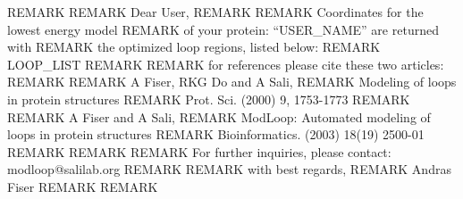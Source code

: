 REMARK 
REMARK     Dear User,
REMARK    
REMARK     Coordinates for the lowest energy model 
REMARK     of your protein: ``USER_NAME''  are returned with 
REMARK     the optimized loop regions, listed below: 
REMARK     LOOP_LIST
REMARK     
REMARK     for references please cite these two articles:
REMARK
REMARK        A Fiser, RKG Do and A Sali, 
REMARK        Modeling of loops in protein structures
REMARK        Prot. Sci. (2000) 9, 1753-1773
REMARK
REMARK        A Fiser and A Sali,
REMARK        ModLoop: Automated modeling of loops in protein structures
REMARK        Bioinformatics. (2003) 18(19) 2500-01
REMARK
REMARK
REMARK     For further inquiries, please contact: modloop@salilab.org
REMARK     
REMARK     with best regards,
REMARK     Andras Fiser
REMARK
REMARK
